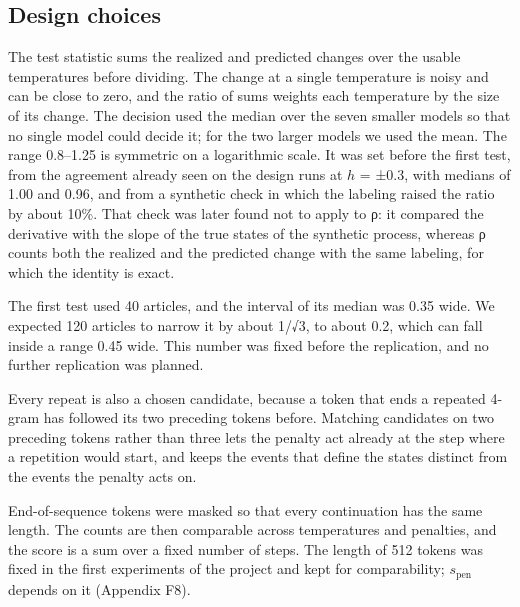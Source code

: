\documentclass[aps,prx,onecolumn,superscriptaddress,longbibliography]{revtex4-2}
\begin{document}
\subsection{Design choices}

The test statistic sums the realized and predicted changes over the usable temperatures before dividing. The change at a single temperature is noisy and can be close to zero, and the ratio of sums weights each temperature by the size of its change. The decision used the median over the seven smaller models so that no single model could decide it; for the two larger models we used the mean. The range 0.8--1.25 is symmetric on a logarithmic scale. It was set before the first test, from the agreement already seen on the design runs at \(h\) = ±0.3, with medians of 1.00 and 0.96, and from a synthetic check in which the labeling raised the ratio by about 10\%. That check was later found not to apply to ρ: it compared the derivative with the slope of the true states of the synthetic process, whereas ρ counts both the realized and the predicted change with the same labeling, for which the identity is exact.

The first test used 40 articles, and the interval of its median was 0.35 wide. We expected 120 articles to narrow it by about 1/√3, to about 0.2, which can fall inside a range 0.45 wide. This number was fixed before the replication, and no further replication was planned.

Every repeat is also a chosen candidate, because a token that ends a repeated 4-gram has followed its two preceding tokens before. Matching candidates on two preceding tokens rather than three lets the penalty act already at the step where a repetition would start, and keeps the events that define the states distinct from the events the penalty acts on.

End-of-sequence tokens were masked so that every continuation has the same length. The counts are then comparable across temperatures and penalties, and the score is a sum over a fixed number of steps. The length of 512 tokens was fixed in the first experiments of the project and kept for comparability; \(s_{\mathrm{pen}}\) depends on it (Appendix F8).
\end{document}
